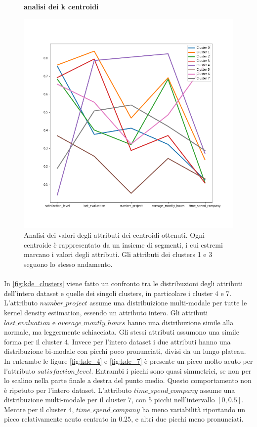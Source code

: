 \documentclass[10pt,a4paper,twocolumn]{report}
\begin{document}
\begin{figure}[hbtp]
\centering
\textbf{analisi dei k centroidi}\par
\includegraphics[width=1\columnwidth]{../images/k-centroids_analysis.png}
\caption{Analisi dei valori degli attributi dei centroidi ottenuti. Ogni centroide è rappresentato da un insieme di segmenti, i cui estremi marcano i valori degli attributi. Gli attributi dei clusters 1 e 3 seguono lo stesso andamento.}
\label{fig:centroids}
\end{figure}

\paragraph{}
In \autoref{fig:kde_clusters} viene fatto un confronto tra le distribuzioni degli attributi dell'intero dataset e quelle dei singoli clusters, in particolare i cluster 4 e 7. L'attributo $number\_project$ assume una distribuizione multi-modale per tutte le kernel density estimation, essendo un attributo intero. Gli attributi $last\_evaluation$ e $average\_montly\_hours$ hanno una distribuzione simile alla normale, ma leggermente schiacciata. Gli stessi attributi assumono una simile forma per il cluster 4. Invece per l'intero dataset i due attributi hanno una distribuzione bi-modale con picchi poco pronunciati, divisi da un lungo plateau. In entrambe le figure \ref{fig:kde_4} e \ref{fig:kde_7} è presente un picco molto acuto per l'attributo $satisfaction\_level$. Entrambi i picchi sono quasi simmetrici, se non per lo scalino nella parte finale a destra del punto medio. Questo comportamento non è ripetuto per l'intero dataset. L'attributo $time\_spend\_company$ assume una distribuzione multi-modale per il cluster 7, con 5 picchi nell'intervallo $\left[0, 0.5\right]$. 
Mentre per il cluster 4, 
$time\_spend\_company$ ha meno variabilità riportando un picco relativamente acuto centrato in $0.25$, e altri due picchi meno pronunciati.
\end{document}
